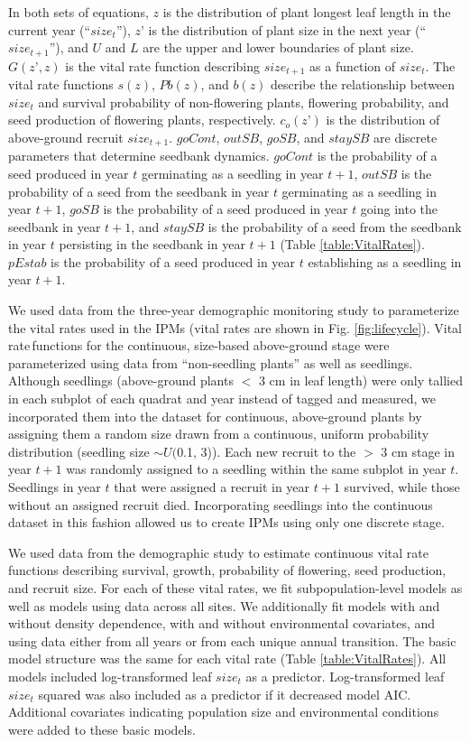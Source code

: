 \documentclass[12pt, letterpaper]{article}
\begin{document}
In both sets of equations, $z$ is the distribution of plant longest leaf length in the current year (“$size_t$”), $z’$ is the distribution of plant size in the next year (“$size_{t+1}$”), and $U$ and $L$ are the upper and lower boundaries of plant size. $G(z’, z)$ is the vital rate function describing $size_{t+1}$ as a function of $size_t$. The vital rate functions $s(z)$, $Pb(z)$, and $b(z)$ describe the relationship between $size_t$ and survival probability of non-flowering plants, flowering probability, and seed production of flowering plants, respectively.  $c_o(z’)$ is the distribution of above-ground recruit $size_{t+1}$. $goCont$, $outSB$, $goSB$, and $staySB$ are discrete parameters that determine seedbank dynamics. $goCont$ is the probability of a seed produced in year $t$ germinating as a seedling in year $t+1$, $outSB$ is the probability of a seed from the seedbank in year $t$ germinating as a seedling in year $t+1$, $goSB$ is the probability of a seed produced in year $t$ going into the seedbank in year $t+1$, and $staySB$ is the probability of a seed from the seedbank in year $t$ persisting in the seedbank in year $t+1$ \cite{Paniw2017} (Table \ref{table:VitalRates}). $pEstab$ is the probability of a seed produced in year $t$ establishing as a seedling in year $t+1$.  

We used data from the three-year demographic monitoring study to parameterize the vital rates used in the IPMs (vital rates are shown in Fig. \ref{fig:lifecycle}). Vital rate functions for the continuous, size-based above-ground stage were parameterized using data from “non-seedling plants” as well as seedlings. Although seedlings (above-ground plants $<$ 3 cm in leaf length) were only tallied in each subplot of each quadrat and year instead of tagged and measured, we incorporated them into the dataset for continuous, above-ground plants by assigning them a random size drawn from a continuous, uniform probability distribution (seedling size $\sim U($0.1, 3)). Each new recruit to the $>$ 3 cm stage in year $t+1$ was randomly assigned to a seedling within the same subplot in year $t$. Seedlings in year $t$ that were assigned a recruit in year $t+1$ survived, while those without an assigned recruit died. Incorporating seedlings into the continuous dataset in this fashion allowed us to create IPMs using only one discrete stage.  

We used data from the demographic study to estimate continuous vital rate functions describing survival, growth, probability of flowering, seed production, and recruit size. For each of these vital rates, we fit subpopulation-level models as well as models using data across all sites. We additionally fit models with and without density dependence, with and without environmental covariates, and using data either from all years or from each unique annual transition. The basic model structure was the same for each vital rate (Table \ref{table:VitalRates}). All models included log-transformed leaf $size_t$ as a predictor. Log-transformed leaf $size_t$ squared was also included as a predictor if it decreased model AIC. Additional covariates indicating population size and environmental conditions were added to these basic models. 
\end{document}

